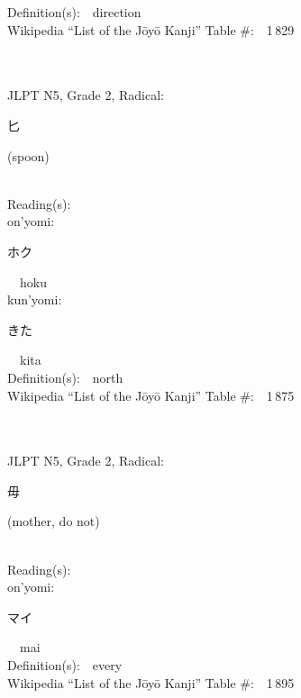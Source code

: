 \begin{multicols}{2}
Definition(s):\ \ direction \\
Wikipedia ``List of the J\=oy\=o Kanji'' Table \#:\ \ 1\,829 \\
\ \ \\
{\fontsize{34pt}{40pt}  }\ \ \\  %
{JLPT N5, Grade 2, Radical:\ \ {\begin{CJK}{UTF8}{min} 匕 \end{CJK}} (spoon) } \\
Reading(s):\ \ \\
{\hspace*{1em}}on'yomi:\ \ \\
{\hspace*{2em}}{\begin{CJK}{UTF8}{min} ホク \end{CJK}}\ \ hoku\ \ \\
{\hspace*{1em}}kun'yomi:\ \ \\
{\hspace*{2em}}{\begin{CJK}{UTF8}{min} きた \end{CJK}}\ \ kita\ \ \\
Definition(s):\ \ north \\
Wikipedia ``List of the J\=oy\=o Kanji'' Table \#:\ \ 1\,875 \\
\ \ \\
{\fontsize{34pt}{40pt}  }\ \ \\  %
{JLPT N5, Grade 2, Radical:\ \ {\begin{CJK}{UTF8}{min} 毋 \end{CJK}} (mother, do not) } \\
Reading(s):\ \ \\
{\hspace*{1em}}on'yomi:\ \ \\
{\hspace*{2em}}{\begin{CJK}{UTF8}{min} マイ \end{CJK}}\ \ mai\ \ \\
Definition(s):\ \ every \\
Wikipedia ``List of the J\=oy\=o Kanji'' Table \#:\ \ 1\,895 \\

\end{multicols}
